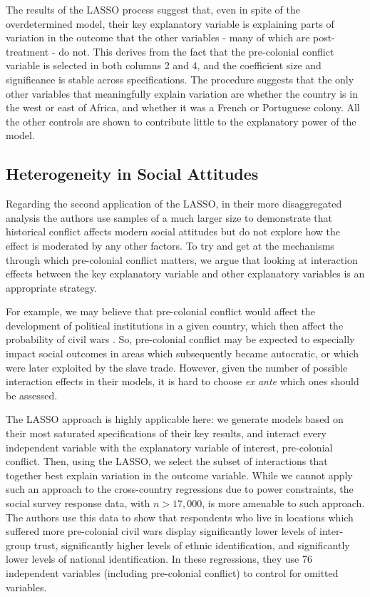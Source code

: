 

The results of the LASSO process suggest that, even in spite of the overdetermined model, their key explanatory variable is explaining parts of variation in the outcome that the other variables - many of which are post-treatment - do not. This derives from the fact that the pre-colonial conflict variable is selected in both columns 2 and 4, and the coefficient size and significance is stable across specifications. The procedure suggests that the only other variables that meaningfully explain variation are whether the country is in the west or east of Africa, and whether it was a French or Portuguese colony. All the other controls are shown to contribute little to the explanatory power of the model. 

\subsection{Heterogeneity in Social Attitudes}

Regarding the second application of the LASSO, in their more disaggregated analysis the authors use samples of a much larger size to demonstrate that historical conflict affects modern social attitudes but do not explore how the effect is moderated by any other factors. To try and get at the mechanisms through which pre-colonial conflict matters, we argue that looking at interaction effects between the key explanatory variable and other explanatory variables is an appropriate strategy. 

For example, we may believe that pre-colonial conflict would affect the development of political institutions in a given country, which then affect the probability of civil wars \citep{AcemogluJohnsonRobinson2001}. So, pre-colonial conflict may be expected to especially impact social outcomes in areas which subsequently became autocratic, or which were later exploited by the slave trade. However, given the number of possible interaction effects in their models, it is hard to choose \textit{ex ante} which ones should be assessed.

The LASSO approach is highly applicable here: we generate models based on their most saturated specifications of their key results, and interact every independent variable with the explanatory variable of interest, pre-colonial conflict. Then, using the LASSO, we select the subset of interactions that together best explain variation in the outcome variable. While we cannot apply such an approach to the cross-country regressions due to power constraints, the social survey response data, with $n > 17,000$, is more amenable to such approach. The authors use this data to show that respondents who live in locations which suffered more pre-colonial civil wars display significantly lower levels of inter-group trust, significantly higher levels of ethnic identification, and significantly lower levels of national identification. In these regressions, they use 76 independent variables (including pre-colonial conflict) to control for omitted variables. 

